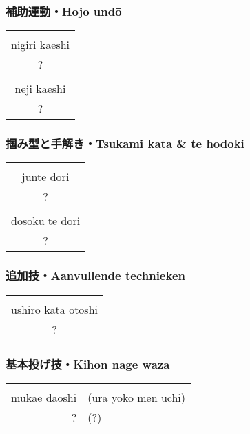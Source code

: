 \subsubsection{補助運動・Hojo und\={o}}
\begin{table}[H]
\begin{center}
\begin{tabular}{c}
    \ruby{}{}\ruby{}{}\\
    nigiri kaeshi\\
    ?\\
    \hline
    \ruby{}{}\\
    neji kaeshi\\
    ?
\end{tabular}
\end{center}
\label{kyuu_6_hojo_undou}
\end{table}

\subsubsection{掴み型と手解き・Tsukami kata \& te hodoki}
\begin{table}[H]
\begin{center}
\begin{tabular}{c}
    \ruby{}{}\ruby{}{}\\
    junte dori\\
    ?\\
    \hline
    \ruby{}{}\\
    dosoku te dori\\
    ?
\end{tabular}
\end{center}
\label{kyuu_6_te_hodoki}
\end{table}

\subsubsection{追加技・Aanvullende technieken}
\begin{table}[H]
\begin{center}
\begin{tabular}{c}
    \ruby{}{}\ruby{}{}\\
    ushiro kata otoshi\\
    ?
\end{tabular}
\end{center}
\label{kyuu_6_additional}
\end{table}

\subsubsection{基本投げ技・Kihon nage waza}
\begin{table}[H]
\begin{center}
\begin{tabular}{rl}
    \ruby{}{}\ruby{}{} & \\
    mukae daoshi & (ura yoko men uchi)\\
    ? & (?)
\end{tabular}
\end{center}
\label{kyuu_6_kihon_nage_waza}
\end{table}

